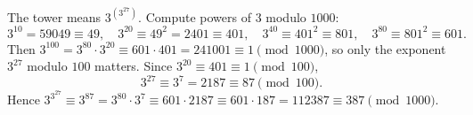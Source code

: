 The tower means $3^{\left(3^{27}\right)}$. Compute powers of $3$ modulo $1000$:
\[
3^{10}=59049\equiv49,\quad 3^{20}\equiv49^2=2401\equiv401,\quad 3^{40}\equiv401^2\equiv801,\quad 3^{80}\equiv801^2\equiv601 .
\]
Then $3^{100}=3^{80}\cdot3^{20}\equiv601\cdot401=241001\equiv1\pmod{1000}$, so only the exponent $3^{27}$ modulo $100$ matters. Since $3^{20}\equiv401\equiv1\pmod{100}$,
\[
3^{27}\equiv3^{7}=2187\equiv87\pmod{100}.
\]
Hence $3^{3^{27}}\equiv3^{87}=3^{80}\cdot3^{7}\equiv601\cdot2187\equiv601\cdot187=112387\equiv\boxed{387}\pmod{1000}$.
